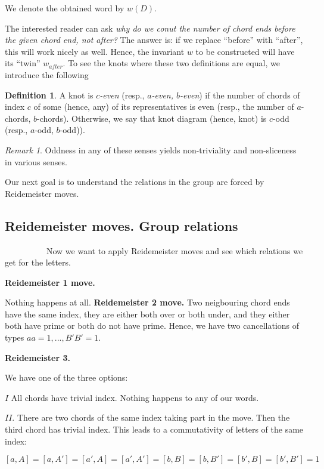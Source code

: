 \documentclass[12pt]{article}
\theoremstyle{definition}
\newtheorem{definition}{Definition}
\theoremstyle{remark}
\newtheorem{remark}{Remark}
\begin{document}
We denote the obtained word by $w(D)$.

The interested reader can ask {\em why do we conut the number of chord ends before the given
chord end, not after?} The answer is: if we replace ``before'' with ``after'', this will work nicely 
as well. Hence, the invariant $w$ to be constructed will have its ``twin'' $w_{after}$.
To see the knots where these two definitions are equal, we introduce the following
\begin{definition}
A knot is {\em $c$-even} (resp., {\em $a$-even, $b$-even}) if the number of chords of index $c$ of some (hence, any)
of its representatives is even (resp., the number of $a$-chords, $b$-chords).
Otherwise, we say that knot diagram (hence, knot) is $c$-odd (resp., $a$-odd, $b$-odd)).
\end{definition}

\begin{remark}
Oddness in any of these senses yields non-triviality and non-sliceness in various senses. 
\end{remark}






Our next goal is to understand the relations in the group are forced by Reidemeister moves.


\subsection{Reidemeister moves. Group relations}
            Now we want to apply Reidemeister moves and see which relations we get for the
letters.



{\bf Reidemeister 1 move.}

Nothing happens at all.
{\bf Reidemeister 2 move.} Two neigbouring chord ends have the same index, they are either both
over or both under, and they either both have prime or both do not have prime. Hence, we have two cancellations of types $aa=1, ..., B'B'=1$.

{\bf Reidemeister 3.} 

We have one of the three options:

$I$ All chords have trivial index. Nothing happens to any of our words.
 
$II.$ 
There are two chords of the same index  taking part in the move.
Then the third chord has trivial index.
This leads to a commutativity of letters of the same index:

$$[a,A]=[a,A']=[a',A]=[a',A']=[b,B]=[b,B']=[b',B]=[b',B']=1 $$
\end{document}
